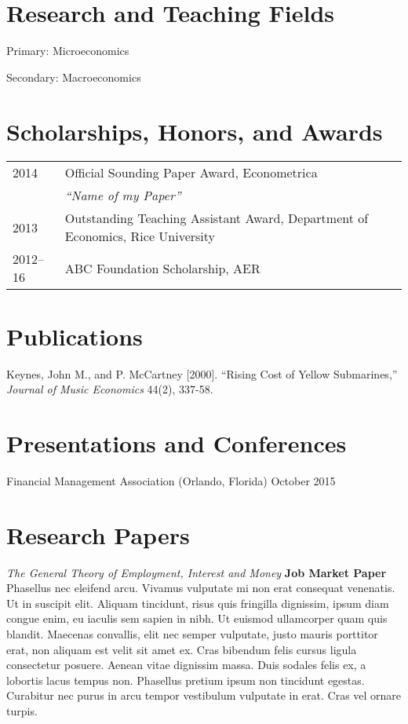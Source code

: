 \documentclass{article}[12]
\begin{document}
\section{Research and Teaching Fields}

Primary: Microeconomics 

Secondary: Macroeconomics


\section{Scholarships, Honors, and Awards}

\begin{tabular}{@{}l l@{}}
 2014     & Official Sounding Paper Award, Econometrica \\
          & \hspace{.5cm} \emph{``Name of my Paper''}   \\
 2013     & Outstanding Teaching Assistant Award, Department of Economics, Rice University \\
 2012--16 & ABC Foundation Scholarship, AER
\end{tabular}


\section{Publications}

Keynes, John M., and P. McCartney [2000]. ``Rising Cost of Yellow Submarines,'' \emph{Journal of Music Economics} 44(2), 337-58.


\section{Presentations and Conferences} 

Financial Management Association (Orlando, Florida) \hfill October 2015 


\section{Research Papers}

\emph{The General Theory of Employment, Interest and Money} \hfill \textbf{Job Market Paper}  \\
Phasellus nec eleifend arcu. Vivamus vulputate mi non erat consequat venenatis. Ut in suscipit elit. Aliquam tincidunt, risus quis fringilla dignissim, ipsum diam congue enim, eu iaculis sem sapien in nibh. Ut euismod ullamcorper quam quis blandit. Maecenas convallis, elit nec semper vulputate, justo mauris porttitor erat, non aliquam est velit sit amet ex. Cras bibendum felis cursus ligula consectetur posuere. Aenean vitae dignissim massa. Duis sodales felis ex, a lobortis lacus tempus non. Phasellus pretium ipsum non tincidunt egestas. Curabitur nec purus in arcu tempor vestibulum vulputate in erat. Cras vel ornare turpis. 
\end{document}
